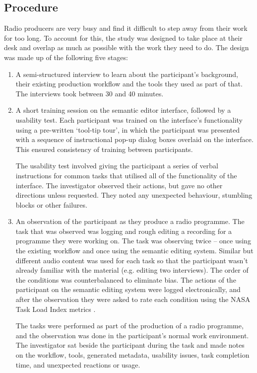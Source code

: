 \subsection{Procedure}
Radio producers are very busy and find it difficult to step away from their
work for too long. To account for this, the study was designed to take place at
their desk and overlap as much as possible with the work they need to do.
The design was made up of the following five stages:
\begin{enumerate}
  \item A semi-structured interview to learn about the participant's
    background, their existing production workflow and the tools they used as
    part of that. The interviews took between 30 and 40 minutes.

  \item A short training session on the semantic editor interface, followed by
    a usability test.  Each participant was trained on the interface's
    functionality using a pre-written `tool-tip tour', in which the participant
    was presented with a sequence of instructional pop-up dialog boxes overlaid
    on the interface.  This ensured consistency of training between
    participants.

    The usability test involved giving the participant a series of verbal
    instructions for common tasks that utilised all of the functionality of the
    interface. The investigator observed their actions, but gave no other
    directions unless requested. They noted any unexpected behaviour, stumbling
    blocks or other failures.

  \item An observation of the participant as they produce a radio programme.
    The task that was observed was logging and rough editing a recording for a
    programme they were working on.  The task was observing twice -- once using
    the existing workflow and once using the semantic editing system.  Similar but
    different audio content was used for each task so that the participant
    wasn't already familiar with the material (e.g. editing two interviews).
    The order of the conditions was counterbalanced to eliminate bias.  The
    actions of the participant on the semantic editing system were logged
    electronically, and after the observation they were asked to rate each
    condition using the NASA Task Load Index metrics \cite{Hart1988}.

    The tasks were performed as part of the production of a radio programme,
    and the observation was done in the participant's normal work environment.
    The investigator sat beside the participant during the task and made notes
    on the workflow, tools, generated metadata, usability issues, task
    completion time, and unexpected reactions or usage.


\end{enumerate}
